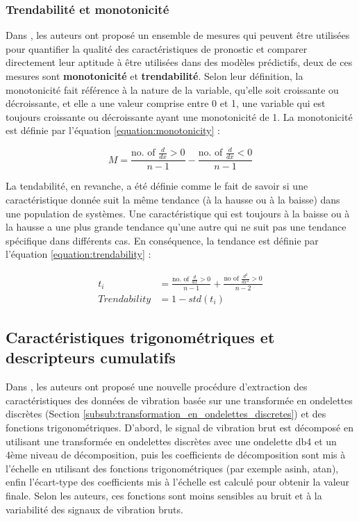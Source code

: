\subsubsection{Trendabilité et monotonicité}%
\label{subsub:trendability_and_monotonicity}
Dans \cite{coble2009}, les auteurs ont proposé un ensemble de mesures qui peuvent être utilisées pour quantifier la qualité des caractéristiques de pronostic et comparer directement leur aptitude à être utilisées dans des modèles prédictifs, deux de ces mesures sont \textbf{monotonicité} et \textbf{trendabilité}. Selon leur définition, la monotonicité fait référence à la nature de la variable, qu'elle soit croissante ou décroissante, et elle a une valeur comprise entre 0 et 1, une variable qui est toujours croissante ou décroissante ayant une monotonicité de 1. La monotonicité est définie par l'équation \ref{equation:monotonicity} :

\begin{equation}
	M=\frac{\text{no. of }\frac{d}{dx} > 0}{n-1} - \frac{\text{no. of }\frac{d}{dx} < 0}{n-1}
\label{equation:monotonicity}
\end{equation}

La tendabilité, en revanche, a été définie comme le fait de savoir si une caractéristique donnée suit la même tendance (à la hausse ou à la baisse) dans une population de systèmes. Une caractéristique qui est toujours à la baisse ou à la hausse a une plus grande tendance qu'une autre qui ne suit pas une tendance spécifique dans différents cas. En conséquence, la tendance est définie par l'équation \ref{equation:trendability} :

\begin{equation}
	\begin{aligned}
		t_i&= \frac{\text{no. of }\frac{d}{dx}>0}{n-1}+\frac{\text{no of } \frac{d^2}{dx^2}>0}{n-2}\\
Trendability&=1-std(t_i)
	\end{aligned}
	\label{equation:trendability}
\end{equation}

\subsection{Caractéristiques trigonométriques et descripteurs cumulatifs}%
\label{sub:trigonometric_features}

Dans \cite{javed2013}, les auteurs ont proposé une nouvelle procédure d'extraction des caractéristiques des données de vibration basée sur une transformée en ondelettes discrètes (Section \ref{subsub:transformation_en_ondelettes_discretes}) et des fonctions trigonométriques. D'abord, le signal de vibration brut est décomposé en utilisant une transformée en ondelettes discrètes avec une ondelette db4 et un 4ème niveau de décomposition, puis les coefficients de décomposition sont mis à l'échelle en utilisant des fonctions trigonométriques (par exemple asinh, atan), enfin l'écart-type des coefficients mis à l'échelle est calculé pour obtenir la valeur finale. Selon les auteurs, ces fonctions sont moins sensibles au bruit et à la variabilité des signaux de vibration bruts.

